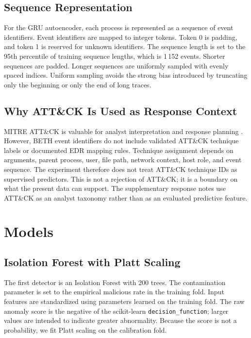 \documentclass[10pt,journal,compsoc]{IEEEtran}
\begin{document}
\subsection{Sequence Representation}

For the GRU autoencoder, each process is represented as a sequence of event identifiers. Event identifiers are mapped to integer tokens. Token 0 is padding, and token 1 is reserved for unknown identifiers. The sequence length is set to the 95th percentile of training sequence lengths, which is 1\,152 events. Shorter sequences are padded. Longer sequences are uniformly sampled with evenly spaced indices. Uniform sampling avoids the strong bias introduced by truncating only the beginning or only the end of long traces.

\subsection{Why ATT\&CK Is Used as Response Context}

MITRE ATT\&CK is valuable for analyst interpretation and response planning \cite{mitre2023,strom2018}. However, BETH event identifiers do not include validated ATT\&CK technique labels or documented EDR mapping rules. Technique assignment depends on arguments, parent process, user, file path, network context, host role, and event sequence. The experiment therefore does not treat ATT\&CK technique IDs as supervised predictors. This is not a rejection of ATT\&CK; it is a boundary on what the present data can support. The supplementary response notes use ATT\&CK as an analyst taxonomy rather than as an evaluated predictive feature.

\section{Models}
\label{sec:models}

\subsection{Isolation Forest with Platt Scaling}

The first detector is an Isolation Forest \cite{liu2008} with 200 trees. The contamination parameter is set to the empirical malicious rate in the training fold. Input features are standardized using parameters learned on the training fold. The raw anomaly score is the negative of the scikit-learn \texttt{decision\_function}; larger values are intended to indicate greater abnormality. Because the score is not a probability, we fit Platt scaling on the calibration fold.
\end{document}
